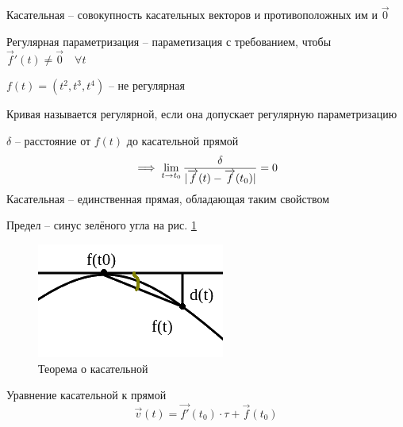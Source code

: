 \begin{definition}
	Касательная -- совокупность касательных векторов и противоположных им и $ \vec{0} $
\end{definition}

\begin{definition}
	Регулярная параметризация -- параметизация с требованием, чтобы $ \vec{f}'(t) \ne \vec{0} \quad \forall t $
\end{definition}

\begin{eg}
	$ f(t) = (t^2, t^3, t^4) $ -- не регулярная
\end{eg}

\begin{definition}
	Кривая называется регулярной, если она допускает регулярную параметризацию
\end{definition}

\begin{theorem}
	$ \delta $ -- расстояние от $ f(t) $ до касательной прямой
	$$ \implies \lim\limits_{t \to t_0} \frac\delta{|\overrightarrow{f}(t) - \overrightarrow{f}(t_0)|} = 0 $$
	Касательная -- единственная прямая, обладающая таким свойством
\end{theorem}

\begin{remark}
	Предел -- синус зелёного угла на рис. \ref{fig:1}
\end{remark}

\begin{figure}[!ht]
	\includegraphics[scale=1]{1}
	\caption{Теорема о касательной}
	\label{fig:1}
\end{figure}

\begin{undefthm}{Уравнение касательной к прямой}
	$$ \vec{v}(t) = \vec{f'}(t_0) \cdot \tau + \vec{f}(t_0) $$
\end{undefthm}

